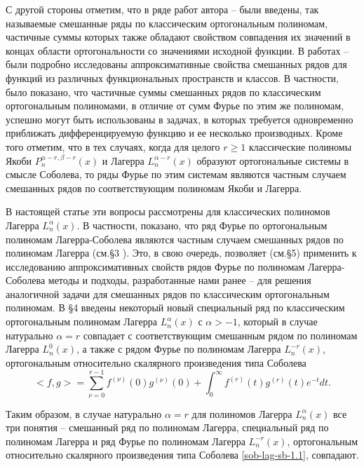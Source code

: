 С другой стороны отметим, что в ряде работ автора \cite{sob-lag-sb-Shar11} -- \cite{sob-lag-sb-Shar16}  были введены, так называемые смешанные ряды по классическим ортогональным полиномам, частичные суммы которых также обладают свойством совпадения их значений в концах области ортогональности  со  значениями исходной функции.  В работах \cite{sob-lag-sb-Shar11} -- \cite{sob-lag-sb-Shar16} были подробно исследованы аппроксимативные свойства смешанных рядов для функций из различных функциональных пространств и классов. В частности, было показано, что частичные суммы смешанных рядов по классическим ортогональным полиномами, в отличие от сумм Фурье по этим же полиномам, успешно могут быть использованы в задачах, в которых требуется одновременно приближать дифференцируемую функцию и ее несколько производных. Кроме того отметим, что в тех случаях, когда для целого $r\ge1$ классические полиномы Якоби $P_n^{\alpha-r,\beta-r}(x)$  и Лагерра $L_n^{\alpha-r}(x)$ образуют ортогональные системы в смысле Соболева, то ряды Фурье по этим системам являются частным случаем смешанных рядов по соответствующим полиномам Якоби и Лагерра.

В настоящей статье эти вопросы рассмотрены для классических полиномов Лагерра $L_n^\alpha(x)$. В частности, показано, что     ряд Фурье по ортогональным полиномам Лагерра-Соболева   являются частным случаем смешанных рядов по полиномам Лагерра  (см.\S3 ). Это, в свою очередь,  позволяет (см.\S5) применить к исследованию аппроксимативных свойств рядов Фурье по полиномам Лагерра-Соболева методы и подходы, разработанные нами ранее \cite{sob-lag-sb-Shar11} -- \cite{sob-lag-sb-Shar16} для решения аналогичной задачи для смешанных рядов по классическим ортогональным полиномам. В \S4 введены некоторый новый специальный ряд по классическим ортогональным полиномам Лагерра $L_n^\alpha(x)$ с $\alpha>-1$, который в случае  натурально $\alpha=r$ совпадает с соответствующим смешанным рядом по полиномам Лагерра $L_n^0(x)$, а также с рядом Фурье по полиномам Лагерра $L_n^{-r}(x)$, ортогональным относительно скалярного произведения типа Соболева
\begin{equation}\label{sob-lag-sb-1.1}
<f,g>=\sum_{\nu=0}^{r-1}f^{(\nu)}(0)g^{(\nu)}(0)+\int_0^\infty f^{(r)}(t)g^{(r)}(t)e^{-t}dt.
\end{equation}


Таким образом, в случае натурально $\alpha=r$ для полиномов Лагерра $L_n^\alpha(x)$ все три понятия -- смешанный ряд по полиномам Лагерра, специальный ряд по полиномам Лагерра и ряд Фурье  по полиномам Лагерра $L_n^{-r}(x)$, ортогональным относительно скалярного произведения типа Соболева \eqref{sob-lag-sb-1.1}, совпадают.

